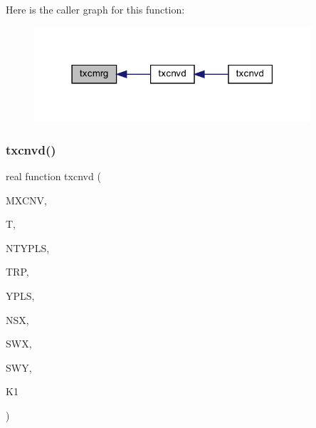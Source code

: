 Here is the caller graph for this function\+:\nopagebreak
\begin{figure}[H]
\begin{center}
\leavevmode
\includegraphics[width=291pt]{Leroi_8f90_a91b093a6d74ab88b54c4e2121d31ffa2_icgraph}
\end{center}
\end{figure}
\mbox{\label{Leroi_8f90_a1cdfcb6ee629073412c28d9cf0215636}} 
\subsubsection{\texorpdfstring{txcnvd()}{txcnvd()}}
{\footnotesize\ttfamily real function txcnvd (\begin{DoxyParamCaption}\item[{integer, intent(in)}]{M\+X\+C\+NV,  }\item[{real, intent(in)}]{T,  }\item[{integer, intent(in)}]{N\+T\+Y\+P\+LS,  }\item[{real, dimension(ntypls), intent(in)}]{T\+RP,  }\item[{real, dimension(4,ntypls), intent(in)}]{Y\+P\+LS,  }\item[{integer, intent(in)}]{N\+SX,  }\item[{real, dimension(nsx), intent(in)}]{S\+WX,  }\item[{real, dimension(nsx,3), intent(in)}]{S\+WY,  }\item[{integer}]{K1 }\end{DoxyParamCaption})}

